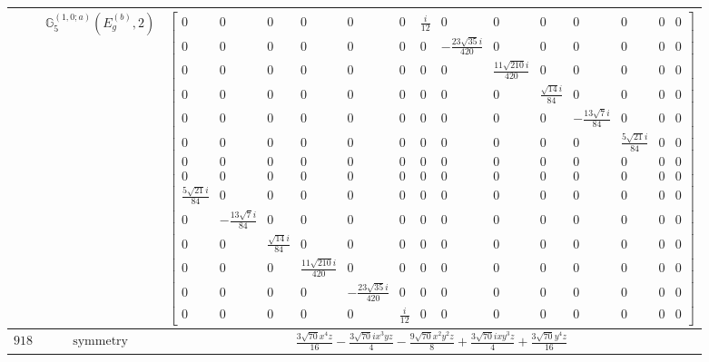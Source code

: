 \documentclass[fleqn,8pt,landscape]{jsarticle}
\begin{document}
\begin{longtable}{ccc}
$  $ & $ \mathbb{G}_{5}^{(1,0;a)}(E_{g}^{(b)},2) $ & $ \begin{bmatrix} 0 & 0 & 0 & 0 & 0 & 0 & \frac{i}{12} & 0 & 0 & 0 & 0 & 0 & 0 & 0 \\ 0 & 0 & 0 & 0 & 0 & 0 & 0 & - \frac{23 \sqrt{35} i}{420} & 0 & 0 & 0 & 0 & 0 & 0 \\ 0 & 0 & 0 & 0 & 0 & 0 & 0 & 0 & \frac{11 \sqrt{210} i}{420} & 0 & 0 & 0 & 0 & 0 \\ 0 & 0 & 0 & 0 & 0 & 0 & 0 & 0 & 0 & \frac{\sqrt{14} i}{84} & 0 & 0 & 0 & 0 \\ 0 & 0 & 0 & 0 & 0 & 0 & 0 & 0 & 0 & 0 & - \frac{13 \sqrt{7} i}{84} & 0 & 0 & 0 \\ 0 & 0 & 0 & 0 & 0 & 0 & 0 & 0 & 0 & 0 & 0 & \frac{5 \sqrt{21} i}{84} & 0 & 0 \\ 0 & 0 & 0 & 0 & 0 & 0 & 0 & 0 & 0 & 0 & 0 & 0 & 0 & 0 \\ 0 & 0 & 0 & 0 & 0 & 0 & 0 & 0 & 0 & 0 & 0 & 0 & 0 & 0 \\ \frac{5 \sqrt{21} i}{84} & 0 & 0 & 0 & 0 & 0 & 0 & 0 & 0 & 0 & 0 & 0 & 0 & 0 \\ 0 & - \frac{13 \sqrt{7} i}{84} & 0 & 0 & 0 & 0 & 0 & 0 & 0 & 0 & 0 & 0 & 0 & 0 \\ 0 & 0 & \frac{\sqrt{14} i}{84} & 0 & 0 & 0 & 0 & 0 & 0 & 0 & 0 & 0 & 0 & 0 \\ 0 & 0 & 0 & \frac{11 \sqrt{210} i}{420} & 0 & 0 & 0 & 0 & 0 & 0 & 0 & 0 & 0 & 0 \\ 0 & 0 & 0 & 0 & - \frac{23 \sqrt{35} i}{420} & 0 & 0 & 0 & 0 & 0 & 0 & 0 & 0 & 0 \\ 0 & 0 & 0 & 0 & 0 & \frac{i}{12} & 0 & 0 & 0 & 0 & 0 & 0 & 0 & 0 \end{bmatrix} $ \\ \hline
$ 918 $ & $ \text{symmetry} $ & $ \frac{3 \sqrt{70} x^{4} z}{16} - \frac{3 \sqrt{70} i x^{3} y z}{4} - \frac{9 \sqrt{70} x^{2} y^{2} z}{8} + \frac{3 \sqrt{70} i x y^{3} z}{4} + \frac{3 \sqrt{70} y^{4} z}{16} $ \\

\end{longtable}
\end{document}

